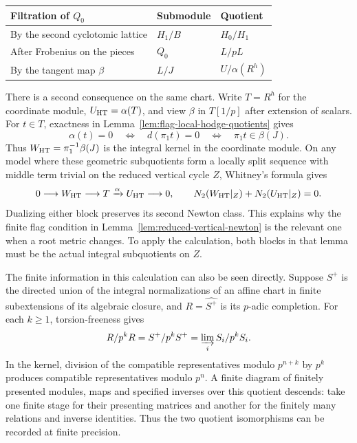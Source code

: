 \begin{construction}
\begin{tabular}{@{}lll@{}}
\toprule
Filtration of \(Q_0\) & Submodule & Quotient \\
\midrule
By the second cyclotomic lattice & \(H_1/B\) & \(H_0/H_1\) \\
After Frobenius on the pieces & \(Q_0\) & \(L/pL\) \\
By the tangent map \(\beta\) & \(L/J\) & \(U/\alpha(R^h)\) \\
\bottomrule
\end{tabular}
\caption{Two readings of the same integral quotient. The first two lines compute the Frobenius factor in its relative square. The last line determines the sign of the Lie correction.}\label{fig:local-cyclotomic-quotients}
\end{construction}

There is a second consequence on the same chart. Write \(T=R^h\) for the coordinate module, \(U_{\rm HT}=\alpha(T)\), and view \(\beta\) in \(T[1/p]\) after extension of scalars. For \(t\in T\), exactness in Lemma~\ref{lem:flag-local-hodge-quotients} gives
\[
 \alpha(t)=0
 \quad\Longleftrightarrow\quad d(\pi_1t)=0
 \quad\Longleftrightarrow\quad \pi_1 t\in\beta(J).
\]
Thus \(W_{\rm HT}=\pi_1^{-1}\beta(J)\) is the integral kernel in the coordinate module. On any model where these geometric subquotients form a locally split sequence with middle term trivial on the reduced vertical cycle \(Z\), Whitney's formula gives
\[
 0\longrightarrow W_{\rm HT}\longrightarrow T
             \xrightarrow{\alpha} U_{\rm HT}\longrightarrow0,\qquad
 N_2(W_{\rm HT}|_Z)+N_2(U_{\rm HT}|_Z)=0 .
\]
Dualizing either block preserves its second Newton class. This explains why the finite flag condition in Lemma~\ref{lem:reduced-vertical-newton} is the relevant one when a root metric changes. To apply the calculation, both blocks in that lemma must be the actual integral subquotients on \(Z\).

The finite information in this calculation can also be seen directly. Suppose \(S^+\) is the directed union of the integral normalizations of an affine chart in finite subextensions of its algebraic closure, and \(R=\widehat{S^+}\) is its \(p\)-adic completion. For each \(k\ge1\), torsion-freeness gives
\[
      R/p^kR=S^+/p^kS^+=\varinjlim_i S_i/p^kS_i .
\]
In the kernel, division of the compatible representatives modulo \(p^{n+k}\) by \(p^k\) produces compatible representatives modulo \(p^n\). A finite diagram of finitely presented modules, maps and specified inverses over this quotient descends: take one finite stage for their presenting matrices and another for the finitely many relations and inverse identities. Thus the two quotient isomorphisms can be recorded at finite precision.

